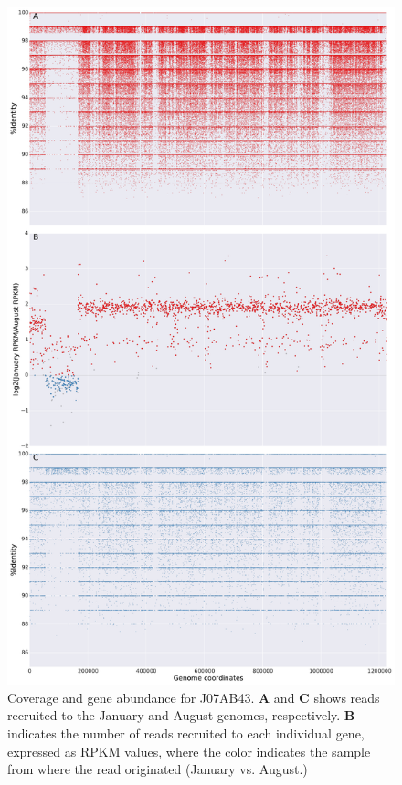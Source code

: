 \begin{figure}[!hbtp]
  \centering
  \includegraphics[width=\textwidth,height=0.8\textheight,keepaspectratio]{Chapter5/Figures/coverage_plots/J07AB43_coverage.pdf}
  \caption{Coverage and gene abundance for J07AB43. \textbf{A} and \textbf{C} shows reads recruited to the January and August genomes, respectively. \textbf{B} indicates the number of reads recruited to each individual gene, expressed as RPKM values, where the color indicates the sample from where the read originated (January vs. August.)}
  \label{J07AB43ccoverage}
\end{figure}

